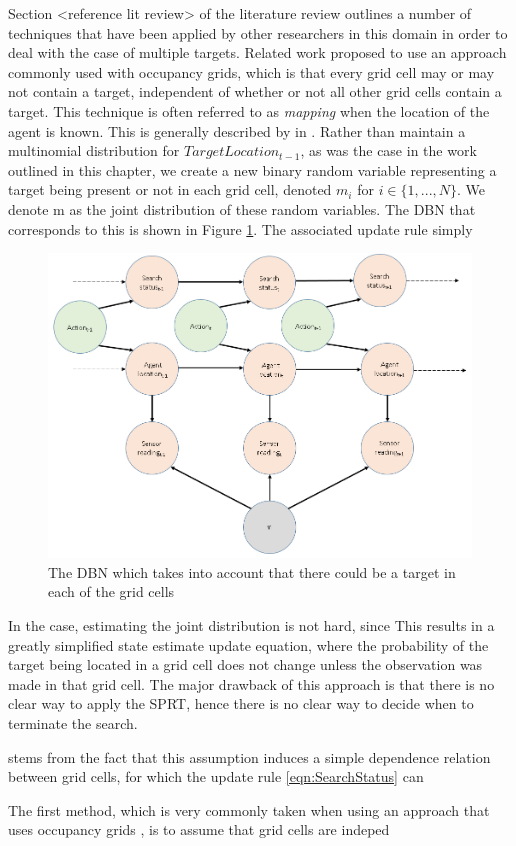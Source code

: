 Section <reference lit review> of the literature review outlines a number of techniques that have been applied by other researchers in this domain in order to deal with the case of multiple targets.  Related work \cite{Waharte2009CoordinatedUAVs} proposed to use an approach commonly used with occupancy grids, which is that every grid cell may or may not contain a target, independent of whether or not all other grid cells contain a target. This technique is often referred to as \textit{mapping} when the location of the agent is known. This is generally described by \citeauthor{Thrun:2005:ProbabilisticRobotics} in  \cite[P.~284]{Thrun:2005:ProbabilisticRobotics}. Rather than maintain a multinomial distribution for $TargetLocation_{t-1}$, as was the case in the work outlined in this chapter, we create a new binary random variable representing a target being present or not in each grid cell, denoted $m_i$ for $i \in \{1,...,N\}$. We denote m as the joint distribution of these random variables. The DBN that corresponds to this is shown in Figure \ref{fig:DBNWithMultipleIndependent}. The associated update rule simply 

\begin{figure}
    \centering
    \includegraphics[width = 0.75\linewidth]{Chapters/MultiAgentTargetDetection/Figs/DBNs/DBNWithMultipleIndependentSources.png}
    \caption{The DBN which takes into account that there could be a target in each of the grid cells}
    \label{fig:DBNWithMultipleIndependent}
\end{figure}





In the case, estimating the joint distribution is not hard, since This results in a greatly simplified state estimate update equation, where the probability of the target being located in a grid cell does not change unless the observation was made in that grid cell. The major drawback of this approach is that there is no clear way to apply the SPRT, hence there is no clear way to decide when to terminate the search. 


stems from the fact that this assumption induces a simple dependence relation between grid cells, for which the update rule \ref{eqn:SearchStatus} can 


The first method, which is very commonly taken when using an approach that uses occupancy grids \cite{Elfes1989UsingNavigation}, is to assume that grid cells are indeped
